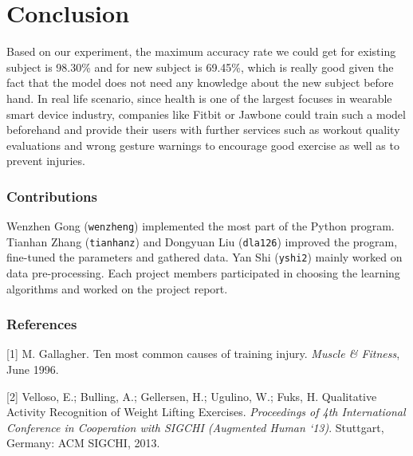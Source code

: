 \documentclass{article} %
\begin{document}
%

\section{Conclusion}

Based on our experiment, the maximum accuracy rate we could get for existing subject is 98.30\% and for new subject is 69.45\%, which is really good given the fact that the model does not need any knowledge about the new subject before hand.
In real life scenario, since health is one of the largest focuses in wearable smart device industry, companies like Fitbit or Jawbone could train such a model beforehand and provide their users with further services such as workout quality evaluations and wrong gesture warnings to encourage good exercise as well as to prevent injuries.

\subsubsection*{Contributions}

Wenzhen Gong (\texttt{wenzheng}) implemented the most part of the Python program. Tianhan Zhang (\texttt{tianhanz}) and Dongyuan Liu (\texttt{dla126}) improved the program, fine-tuned the parameters and gathered data. Yan Shi (\texttt{yshi2}) mainly worked on data pre-processing. Each project members participated in choosing the learning algorithms and worked on the project report.

\subsubsection*{References}

\small{
[1] M. Gallagher. Ten most common causes of training injury. {\it Muscle \& Fitness}, June 1996.

[2] Velloso, E.; Bulling, A.; Gellersen, H.; Ugulino, W.; Fuks, H. Qualitative Activity Recognition of Weight Lifting Exercises. {\it Proceedings of 4th International Conference in Cooperation with SIGCHI (Augmented Human `13)}. Stuttgart, Germany: ACM SIGCHI, 2013.
}
\end{document}
